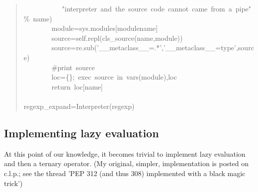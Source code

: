 \documentclass[10pt,english]{article}
\begin{document}
\begin{quote}
\begin{ttfamily}
\begin{flushleft}
\mbox{~~~~~~~~~~~"interpreter~and~the~source~code~cannot~came~from~a~pipe"{\%}~name)}\\
\mbox{~~~~~~~~module=sys.modules[modulename]~}\\
\mbox{~~~~~~~~source=self.repl(cls{\_}source(name,module))}\\
\mbox{~~~~~~~~source=re.sub('{\_}{\_}metaclass{\_}{\_}=.*','{\_}{\_}metaclass{\_}{\_}=type',source)}\\
\mbox{~~~~~~~~{\#}print~source}\\
\mbox{~~~~~~~~loc={\{}{\}};~exec~source~in~vars(module),loc}\\
\mbox{~~~~~~~~return~loc[name]}\\
\mbox{}\\
\mbox{regexp{\_}expand=Interpreter(regexp)}
\end{flushleft}\end{ttfamily}
\end{quote}



\hypertarget{implementing-lazy-evaluation}{}
\subsection*{Implementing lazy evaluation}

At this point of our knowledge, it becomes trivial to implement lazy 
evaluation and then a ternary operator. (My original, simpler, implementation
is posted on c.l.p.; see the thread 'PEP 312 (and thus 308) implemented 
with a black magic trick')



\hypertarget{implementing-a-ternary-operator}{}
\end{document}
